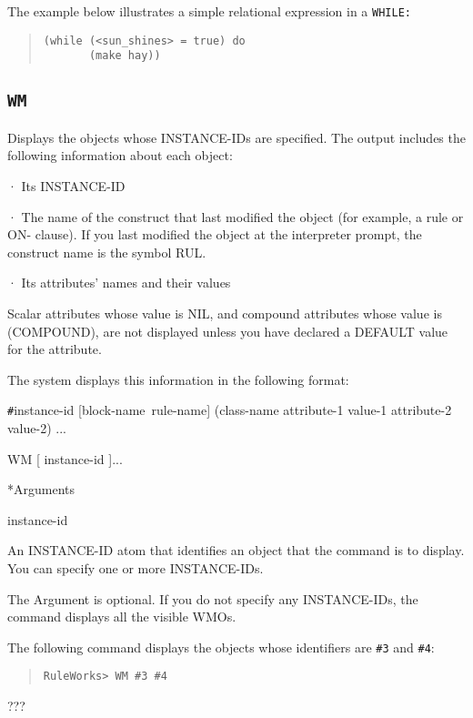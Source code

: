 {{\Example

The example below illustrates a simple relational expression in a
\tt{WHILE}:

\begin{quote}
\begin{verbatim}
(while (<sun_shines> = true) do
       (make hay))
\end{verbatim}
\end{quote}
     
\subsection{\tt{WM}}

Displays the objects whose INSTANCE-IDs are specified. The
output includes the following information about each object:

·  Its INSTANCE-ID

·  The name of the construct that last modified the object
(for example, a rule or ON- clause). If you last modified the
object at the interpreter prompt, the construct name is the
symbol RUL.

·  Its attributes' names and their values

Scalar attributes whose value is NIL, and compound attributes
whose value is (COMPOUND), are not displayed unless you have
declared a DEFAULT value for the attribute.

The system displays this information in the following format:

\verb|#|instance-id [block-name~rule-name] (class-name attribute-1
value-1 attribute-2 value-2) ...

\Format

WM [ instance-id ]...

*Arguments

instance-id

An INSTANCE-ID atom that identifies an object that the
command is to display. You can specify one or more
INSTANCE-IDs.

The Argument is optional. If you do not specify any
INSTANCE-IDs, the command displays all the visible WMOs.

\Example

The following command displays the objects whose identifiers
are \verb|#3| and \verb|#4|:

\begin{quote}
\begin{verbatim}
RuleWorks> WM #3 #4
\end{verbatim}
\end{quote}
???

}}
